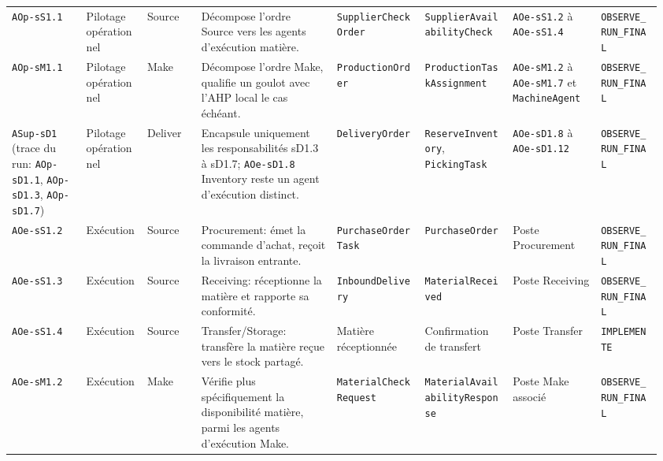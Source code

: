\begin{landscape}
{\begin{longtable}{L{0.11\linewidth} L{0.09\linewidth} L{0.08\linewidth} L{0.20\linewidth} L{0.13\linewidth} L{0.13\linewidth} L{0.13\linewidth} L{0.09\linewidth}}
\texttt{AOp-s\allowbreak S1.1} & Pilotage opérationnel & Source & Décompose l'ordre Source vers les agents d'exécution matière. & \texttt{Supplier\allowbreak Check\allowbreak Order} & \texttt{Supplier\allowbreak Availability\allowbreak Check} & \texttt{AOe-s\allowbreak S1.2} à \texttt{AOe-s\allowbreak S1.4} & \texttt{OBSERVE\_\allowbreak RUN\_\allowbreak FINAL} \\
\texttt{AOp-s\allowbreak M1.1} & Pilotage opérationnel & Make & Décompose l'ordre Make, qualifie un goulot avec l'AHP local le cas échéant. & \texttt{Production\allowbreak Order} & \texttt{Production\allowbreak Task\allowbreak Assignment} & \texttt{AOe-s\allowbreak M1.2} à \texttt{AOe-s\allowbreak M1.7} et \texttt{Machine\allowbreak Agent} & \texttt{OBSERVE\_\allowbreak RUN\_\allowbreak FINAL} \\
\texttt{ASup-s\allowbreak D1} (trace du run: \texttt{AOp-s\allowbreak D1.1}, \texttt{AOp-s\allowbreak D1.3}, \texttt{AOp-s\allowbreak D1.7}) & Pilotage opérationnel & Deliver & Encapsule uniquement les responsabilités sD1.3 à sD1.7; \texttt{AOe-s\allowbreak D1.8} Inventory reste un agent d'exécution distinct. & \texttt{Delivery\allowbreak Order} & \texttt{Reserve\allowbreak Inventory}, \texttt{Picking\allowbreak Task} & \texttt{AOe-s\allowbreak D1.8} à \texttt{AOe-s\allowbreak D1.12} & \texttt{OBSERVE\_\allowbreak RUN\_\allowbreak FINAL} \\
\texttt{AOe-s\allowbreak S1.2} & Exécution & Source & Procurement: émet la commande d'achat, reçoit la livraison entrante. & \texttt{Purchase\allowbreak Order\allowbreak Task} & \texttt{Purchase\allowbreak Order} & Poste Procurement & \texttt{OBSERVE\_\allowbreak RUN\_\allowbreak FINAL} \\
\texttt{AOe-s\allowbreak S1.3} & Exécution & Source & Receiving: réceptionne la matière et rapporte sa conformité. & \texttt{Inbound\allowbreak Delivery} & \texttt{Material\allowbreak Received} & Poste Receiving & \texttt{OBSERVE\_\allowbreak RUN\_\allowbreak FINAL} \\
\texttt{AOe-s\allowbreak S1.4} & Exécution & Source & Transfer/Storage: transfère la matière reçue vers le stock partagé. & Matière réceptionnée & Confirmation de transfert & Poste Transfer & \texttt{IMPLEMENTE} \\
\texttt{AOe-s\allowbreak M1.2} & Exécution & Make & Vérifie plus spécifiquement la disponibilité matière, parmi les agents d'exécution Make. & \texttt{Material\allowbreak Check\allowbreak Request} & \texttt{Material\allowbreak Availability\allowbreak Response} & Poste Make associé & \texttt{OBSERVE\_\allowbreak RUN\_\allowbreak FINAL} \\

\end{longtable}}
\end{landscape}
